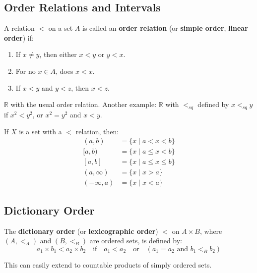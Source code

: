 \documentclass[11pt]{report}
\begin{document}
\subsection{Order Relations and Intervals}

\begin{defbox}
A relation $<$ on a set $A$ is called an \textbf{order relation} (or \textbf{simple order}, \textbf{linear order}) if:
\begin{enumerate}
    \item If $x \neq y$, then either $x < y$ or $y < x$.
    \item For no $x \in A$, does $x < x$.
    \item If $x < y$ and $y < z$, then $x < z$.
\end{enumerate}
\end{defbox}

\begin{exbox}
$\mathbb{R}$ with the usual order relation. Another example: $\mathbb{R}$ with $<_{sq}$ defined by $x <_{sq} y$ if $x^2 < y^2$, or $x^2 = y^2$ and $x < y$.
\end{exbox}

\begin{defbox}
If $X$ is a set with a $<$ relation, then:
\begin{align*}
(a,b) &= \{x \mid a < x < b\} \\
[a,b) &= \{x \mid a \leq x < b\} \\
[a,b] &= \{x \mid a \leq x \leq b\} \\
(a, \infty) &= \{x \mid x > a\} \\
(-\infty, a) &= \{x \mid x < a\}
\end{align*}
\end{defbox}

\subsection{Dictionary Order}

\begin{defbox}
The \textbf{dictionary order} (or \textbf{lexicographic order}) $<$ on $A \times B$, where $(A, <_A)$ and $(B, <_B)$ are ordered sets, is defined by:
\[a_1 \times b_1 < a_2 \times b_2 \quad \text{if} \quad a_1 < a_2 \quad \text{or} \quad (a_1 = a_2 \text{ and } b_1 <_B b_2)\]
\end{defbox}

\begin{rembox}
This can easily extend to countable products of simply ordered sets.
\end{rembox}
\end{document}
